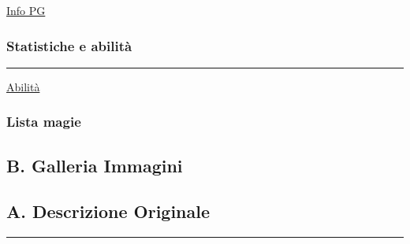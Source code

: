 \href{Info\%20PG\%203043847ed767416a900f6caae343507f.csv}{Info PG}

\subsubsection{Statistiche e abilità}\label{statistiche-e-abilituxe0}

\begin{center}\rule{0.5\linewidth}{0.5pt}\end{center}

\href{Abilita\%CC\%80\%2088163116ffda4d90b9be228ef46e256c.csv}{Abilità}

\subsubsection{Lista magie}\label{lista-magie}

\subsection{B. Galleria Immagini}\label{b.-galleria-immagini}

\subsection{A. Descrizione Originale}\label{a.-descrizione-originale}

\begin{center}\rule{0.5\linewidth}{0.5pt}\end{center}
